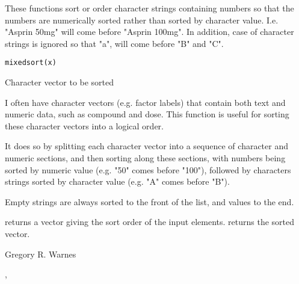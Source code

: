 \begin{Description}\relax
These functions sort or order character strings containing numbers so
that the numbers are numerically sorted rather than sorted by
character value.  I.e. "Asprin 50mg" will come before "Asprin 100mg".
In addition, case of character strings is ignored so that "a", will
come before "B" and "C".
\end{Description}
\begin{Usage}
\begin{verbatim}
mixedsort(x)
\end{verbatim}
\end{Usage}
\begin{Arguments}
\begin{ldescription}
\item[\code{x}] Character vector to be sorted 
\end{ldescription}
\end{Arguments}
\begin{Details}\relax
I often have character vectors (e.g. factor labels) that contain
both text and numeric data, such as compound and dose.  This function
is useful for sorting these character vectors into a logical order.

It does so by splitting each character vector into a sequence of
character and numeric sections, and then sorting along these sections,
with numbers being sorted by numeric value (e.g. "50" comes before
"100"), followed by characters strings sorted by character
value (e.g. "A" comes before "B").

Empty strings are always sorted to the front of the list, and 
values to the end.
\end{Details}
\begin{Value}
 returns a vector giving the sort order of the input
elements.  returns the sorted vector.
\end{Value}
\begin{Author}\relax
Gregory R. Warnes 
\end{Author}
\begin{SeeAlso}\relax
{}, 
\end{SeeAlso}
